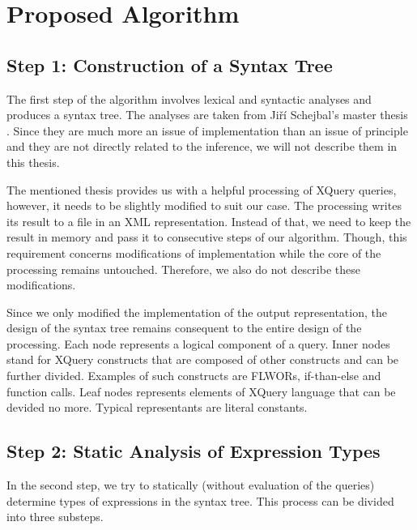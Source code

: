 \chapter{Proposed Algorithm}

\section{Step 1: Construction of a Syntax Tree}
The first step of the algorithm involves lexical and syntactic analyses and produces a syntax tree. The analyses are taken from Ji\v r\'{i} Schejbal's master thesis . Since they are much more an issue of implementation than an issue of principle and they are not directly related to the inference, we will not describe them in this thesis.

The mentioned thesis provides us with a helpful processing of XQuery queries, however, it needs to be slightly modified to suit our case. The processing writes its result to a file in an XML representation. Instead of that, we need to keep the result in memory and pass it to consecutive steps of our algorithm. Though, this requirement concerns modifications of implementation while the core of the processing remains untouched. Therefore, we also do not describe these modifications.

Since we only modified the implementation of the output representation, the design of the syntax tree remains consequent to the entire design of the processing. Each node represents a logical component of a query. Inner nodes stand for XQuery constructs that are composed of other constructs and can be further divided. Examples of such constructs are FLWORs, if-than-else and function calls. Leaf nodes represents elements of XQuery language that can be devided no more. Typical representants are literal constants. 


\section{Step 2: Static Analysis of Expression Types}
In the second step, we try to statically (without evaluation of the queries) determine types of expressions in the syntax tree. This process can be divided into three substeps.

